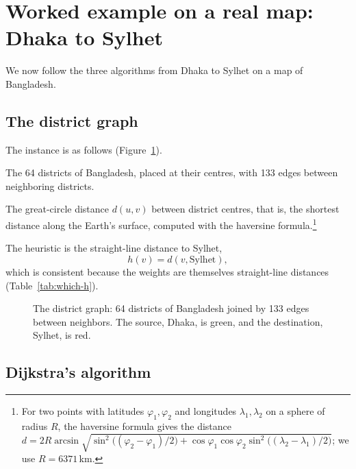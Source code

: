 \section{Worked example on a real map: Dhaka to Sylhet}\label{sec:casestudy}

We now follow the three algorithms from Dhaka to Sylhet on a map of
Bangladesh.

\subsection{The district graph}\label{sec:mapgraph}

The instance is as follows (Figure~\ref{fig:mapgraph}).

\begin{description}[font=\normalfont\itshape, leftmargin=1.5em, labelindent=0pt]
    \item[Graph.] The 64 districts of Bangladesh, placed at their centres, with
    133 edges between neighboring districts.
  \item[Weights.] The great-circle distance $d(u,v)$ between district centres,
    that is, the shortest distance along the Earth's surface, computed with the
    haversine formula.\footnote{For two points with latitudes $\varphi_1,
    \varphi_2$ and longitudes $\lambda_1, \lambda_2$ on a sphere of radius
    $R$, the haversine formula gives the distance
    $d = 2R \arcsin \sqrt{\sin^2\bigl((\varphi_2 - \varphi_1)/2\bigr) + \cos \varphi_1
    \cos \varphi_2 \sin^2\bigl((\lambda_2 - \lambda_1)/2\bigr)}$; we use
    $R = 6371$\,km.}
\end{description}

The heuristic is the straight-line distance to Sylhet,
\begin{equation}\label{eq:hmap}
  h(v) = d(v, \text{Sylhet}),
\end{equation}
which is consistent because the weights are themselves straight-line distances
(Table~\ref{tab:which-h}).

\begin{figure}[htbp]
  \centering
  
  \caption{The district graph: 64 districts of Bangladesh joined by 133 edges
    between neighbors. The source, Dhaka, is green, and the destination, Sylhet, is
    red.}\label{fig:mapgraph}
\end{figure}

\subsection{Dijkstra's algorithm}\label{sec:map-dijkstra}

